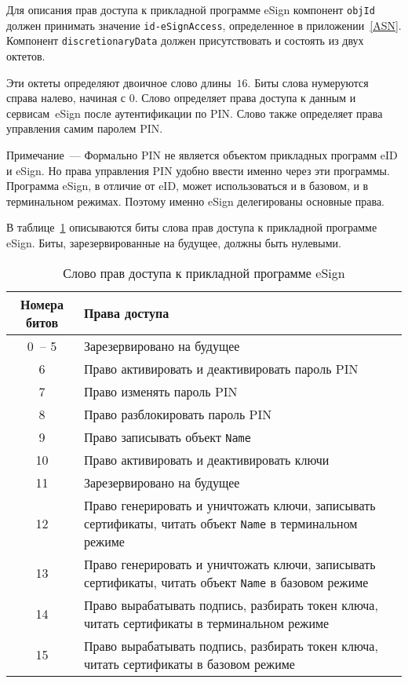 Для описания прав доступа к прикладной программе eSign компонент \verb|objId| 
должен принимать значение \verb|id-eSignAccess|, определенное в 
приложении~\ref{ASN}. Компонент \verb|discretionaryData| должен 
присутствовать и состоять из двух октетов.

Эти октеты определяют двоичное слово длины~$16$. 
Биты слова нумеруются справа налево, начиная с 0. 
Слово определяет права доступа к данным и сервисам~eSign
после аутентификации по PIN. Слово также определяет права управления самим 
паролем PIN. 

\vskip6pt

\begin{note}
Примечание~--- 
Формально PIN не является объектом прикладных программ eID и eSign. 
%
Но права управления PIN удобно ввести именно через эти программы.
%
Программа eSign, в отличие от eID, может использоваться и в базовом, 
и в терминальном режимах. Поэтому именно eSign делегированы основные права.
\end{note}

\vskip6pt

В таблице~\ref{Table.DATA.SMTAccess} описываются биты слова прав доступа
к прикладной программе eSign. Биты, зарезервированные на будущее, 
должны быть нулевыми.

\begin{table}[h!]
\caption{Слово прав доступа к прикладной программе eSign}
\label{Table.DATA.SMTAccess}
\begin{tabular}{|c|p{13.5cm}|}
\hline
Номера битов & Права доступа\\
\hline
\hline
0~-- 5 &  
Зарезервировано на будущее\\ 
%
\hline 
6 &
Право активировать и деактивировать пароль PIN\\ 
%
\hline 
7 &
Право изменять пароль PIN\\ 
%
\hline 
8 &
Право разблокировать пароль PIN\\ 
%
\hline 
9 &
Право записывать объект \texttt{Name}\\ 
%
\hline 
10 &
Право активировать и деактивировать ключи\\ 
%
\hline 
11 &
Зарезервировано на будущее\\ 
%
\hline 
12 &
Право генерировать и уничтожать ключи, записывать сертификаты, 
читать объект \texttt{Name} в терминальном режиме\\ 
%
\hline 
13 &
Право генерировать и уничтожать ключи, записывать сертификаты, 
читать объект \texttt{Name} в базовом режиме\\ 
%
\hline 
14 &
Право вырабатывать подпись, разбирать токен ключа, читать сертификаты 
в терминальном режиме\\ 
%
\hline 
15 &
Право вырабатывать подпись, разбирать токен ключа, читать сертификаты 
в базовом режиме\\ 
\hline 
\end{tabular}
\end{table}


